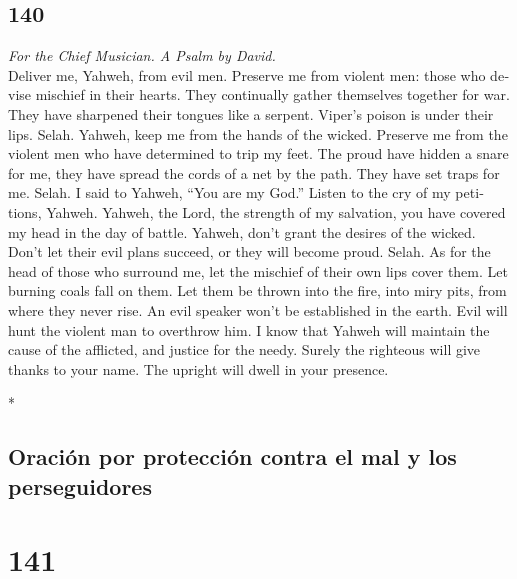 \begin{paracol}{2}
\begin{otherlanguage}{english}
\hypertarget{section-279}{%
\section{140}\label{section-279}}

\emph{For the Chief Musician. A Psalm by David.}\\
 Deliver me, Yahweh, from evil men. Preserve me from
violent men:  those who devise mischief in their hearts.
They continually gather themselves together for war.  They
have sharpened their tongues like a serpent. Viper's poison is under
their lips. Selah.  Yahweh, keep me from the hands of the
wicked. Preserve me from the violent men who have determined to trip my
feet.  The proud have hidden a snare for me, they have
spread the cords of a net by the path. They have set traps for me.
Selah.  I said to Yahweh, ``You are my God.'' Listen to
the cry of my petitions, Yahweh.  Yahweh, the Lord, the
strength of my salvation, you have covered my head in the day of battle.
 Yahweh, don't grant the desires of the wicked. Don't let
their evil plans succeed, or they will become proud. Selah.
 As for the head of those who surround me, let the
mischief of their own lips cover them.  Let burning coals
fall on them. Let them be thrown into the fire, into miry pits, from
where they never rise.  An evil speaker won't be
established in the earth. Evil will hunt the violent man to overthrow
him.  I know that Yahweh will maintain the cause of the
afflicted, and justice for the needy.  Surely the
righteous will give thanks to your name. The upright will dwell in your
presence.

\end{otherlanguage}

\switchcolumn[0]*

\hypertarget{oraciuxf3n-por-protecciuxf3n-contra-el-mal-y-los-perseguidores}{%
\subsection{Oración por protección contra el mal y los
perseguidores}\label{oraciuxf3n-por-protecciuxf3n-contra-el-mal-y-los-perseguidores}}

\hypertarget{section-280}{%
\section{141}\label{section-280}}


\end{paracol}
